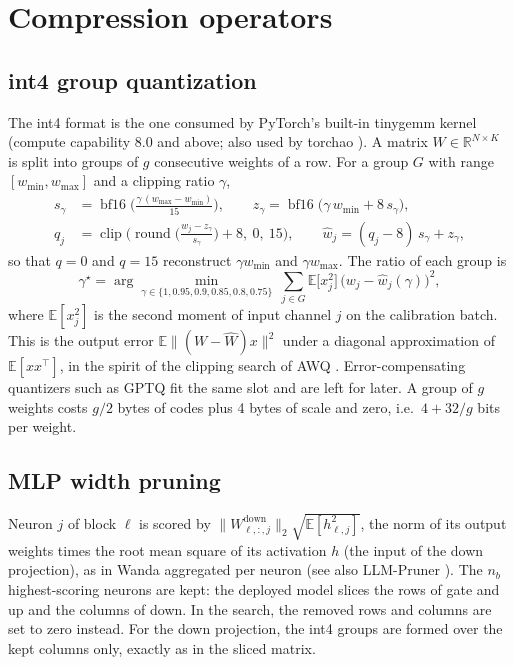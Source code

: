 \documentclass[11pt]{article}
\begin{document}
\section{Compression operators}
\label{sec:operators}

\subsection{int4 group quantization}
The int4 format is the one consumed by PyTorch's built-in tinygemm kernel (compute capability 8.0 and
above; also used by torchao \cite{torchao2024}). A matrix $W\in\mathbb{R}^{N\times K}$ is split into groups of $g$ consecutive
weights of a row. For a group $G$ with range $[w_{\min},w_{\max}]$ and a clipping ratio $\gamma$,
\begin{align}
  s_\gamma &= \operatorname{bf16}\!\Big(\frac{\gamma\,(w_{\max}-w_{\min})}{15}\Big), \qquad
  z_\gamma = \operatorname{bf16}\big(\gamma\,w_{\min} + 8\,s_\gamma\big), \\
  q_j &= \operatorname{clip}\!\Big(\operatorname{round}\Big(\frac{w_j - z_\gamma}{s_\gamma}\Big)+8,\ 0,\ 15\Big),
  \qquad \hat w_j = (q_j-8)\,s_\gamma + z_\gamma ,
\end{align}
so that $q=0$ and $q=15$ reconstruct $\gamma w_{\min}$ and $\gamma w_{\max}$. The ratio of each group is
\begin{equation}
  \gamma^\star = \arg\min_{\gamma\in\{1,0.95,0.9,0.85,0.8,0.75\}}\ \sum_{j\in G}\mathbb{E}\big[x_j^2\big]\,\big(w_j-\hat w_j(\gamma)\big)^2 ,
\end{equation}
where $\mathbb{E}[x_j^2]$ is the second moment of input channel $j$ on the calibration batch. This is the
output error $\mathbb{E}\lVert(W-\hat W)x\rVert^2$ under a diagonal approximation of $\mathbb{E}[xx^\top]$,
in the spirit of the clipping search of AWQ \cite{lin2024awq}. Error-compensating quantizers such as GPTQ
\cite{frantar2023gptq} fit the same slot and are left for later. A group of $g$ weights costs
$g/2$ bytes of codes plus 4 bytes of scale and zero, i.e.\ $4+32/g$ bits per weight.

\subsection{MLP width pruning}
Neuron $j$ of block $\ell$ is scored by $\lVert W^{\text{down}}_{\ell,:,j}\rVert_2\sqrt{\mathbb{E}[h_{\ell,j}^2]}$,
the norm of its output weights times the root mean square of its activation $h$ (the input of the down
projection), as in Wanda \cite{sun2024wanda} aggregated per neuron (see also LLM-Pruner
\cite{ma2023llmpruner}). The $n_b$ highest-scoring neurons are kept: the deployed model slices the rows
of gate and up and the columns of down. In the search, the removed rows and columns are set to zero
instead. For the down projection, the int4 groups are formed over the kept columns only, exactly as in
the sliced matrix.
\end{document}
